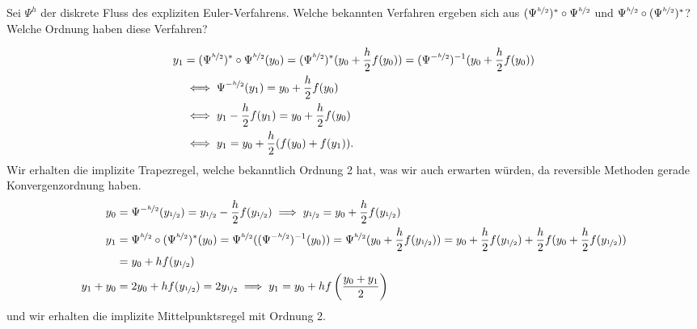 \begin{exercise}
  Sei $\Psi^h$ der diskrete Fluss des expliziten Euler-Verfahrens. Welche bekannten
  Verfahren ergeben sich aus $(\Psi^{\nicefrac{h}{2}})^*\circ\Psi^{\nicefrac{h}{2}}$
  und $\Psi^{\nicefrac{h}{2}}\circ(\Psi^{\nicefrac{h}{2}})^*$? Welche Ordnung
  haben diese Verfahren?
\end{exercise}

\begin{solution}
\begin{align*}
  y_1 &= (\Psi^{\nicefrac{h}{2}})^*\circ\Psi^{\nicefrac{h}{2}}(y_0)
  = (\Psi^{\nicefrac{h}{2}})^*(y_0 + \frac{h}{2}f(y_0))
  = (\Psi^{-\nicefrac{h}{2}})^{-1}(y_0 + \frac{h}{2}f(y_0)) \\
  &\iff \Psi^{-\nicefrac{h}{2}}(y_1) = y_0 + \frac{h}{2}f(y_0) \\
  &\iff y_1 - \frac{h}{2}f(y_1) = y_0 + \frac{h}{2}f(y_0) \\
  &\iff y_1 = y_0 + \frac{h}{2}(f(y_0) + f(y_1)).
\end{align*}
Wir erhalten die implizite Trapezregel, welche bekanntlich Ordnung 2 hat,
was wir auch erwarten würden, da reversible Methoden gerade Konvergenzordnung haben.
\begin{align*}
  y_{0} &= \Psi^{-\nicefrac{h}{2}}(y_{\nicefrac{1}{2}}) = y_{\nicefrac{1}{2}} - \frac{h}{2}f(y_{\nicefrac{1}{2}})
  \implies y_{\nicefrac{1}{2}} = y_0 + \frac{h}{2}f(y_{\nicefrac{1}{2}})\\
  y_1 &= \Psi^{\nicefrac{h}{2}}\circ(\Psi^{\nicefrac{h}{2}})^*(y_0)
  = \Psi^{\nicefrac{h}{2}}((\Psi^{-\nicefrac{h}{2}})^{-1}(y_0))
  = \Psi^{\nicefrac{h}{2}}(y_0 + \frac{h}{2}f(y_{\nicefrac{1}{2}}))
  = y_0 + \frac{h}{2}f(y_{\nicefrac{1}{2}}) + \frac{h}{2}f(y_0 + \frac{h}{2}f(y_{\nicefrac{1}{2}})) \\
  &= y_0 + hf(y_{\nicefrac{1}{2}}) \\
  y_1 + y_0 &= 2y_0 + hf(y_{\nicefrac{1}{2}}) = 2y_{\nicefrac{1}{2}} \implies
  y_1 = y_0 + hf\left(\frac{y_0+y_1}{2}\right)
\end{align*}
und wir erhalten die implizite Mittelpunktsregel mit Ordnung 2.
\end{solution}
